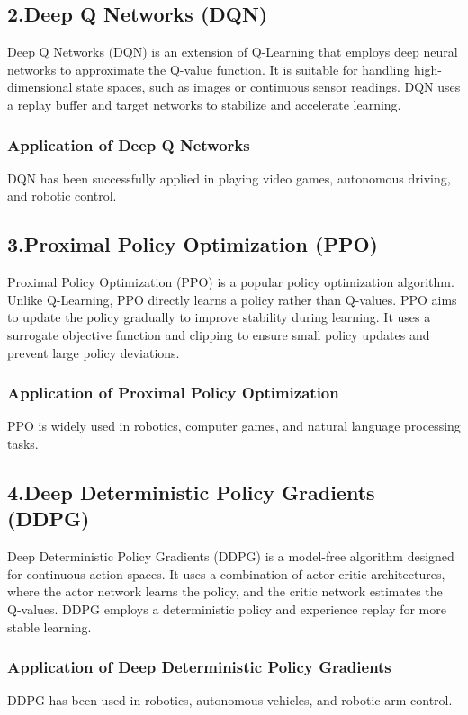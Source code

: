 \documentclass{article}
\begin{document}
\subsection{2.Deep Q Networks (DQN)}
Deep Q Networks (DQN) is an extension of Q-Learning that employs deep neural networks to approximate the Q-value function. It is suitable for handling high-dimensional state spaces, such as images or continuous sensor readings. DQN uses a replay buffer and target networks to stabilize and accelerate learning.

\subsubsection{Application of Deep Q Networks}
DQN has been successfully applied in playing video games, autonomous driving, and robotic control.

\subsection{3.Proximal Policy Optimization (PPO)}
Proximal Policy Optimization (PPO) is a popular policy optimization algorithm. Unlike Q-Learning, PPO directly learns a policy rather than Q-values. PPO aims to update the policy gradually to improve stability during learning. It uses a surrogate objective function and clipping to ensure small policy updates and prevent large policy deviations.

\subsubsection{Application of Proximal Policy Optimization}
PPO is widely used in robotics, computer games, and natural language processing tasks.

\subsection{4.Deep Deterministic Policy Gradients (DDPG)}
Deep Deterministic Policy Gradients (DDPG) is a model-free algorithm designed for continuous action spaces. It uses a combination of actor-critic architectures, where the actor network learns the policy, and the critic network estimates the Q-values. DDPG employs a deterministic policy and experience replay for more stable learning.

\subsubsection{Application of Deep Deterministic Policy Gradients}
DDPG has been used in robotics, autonomous vehicles, and robotic arm control.
\end{document}
